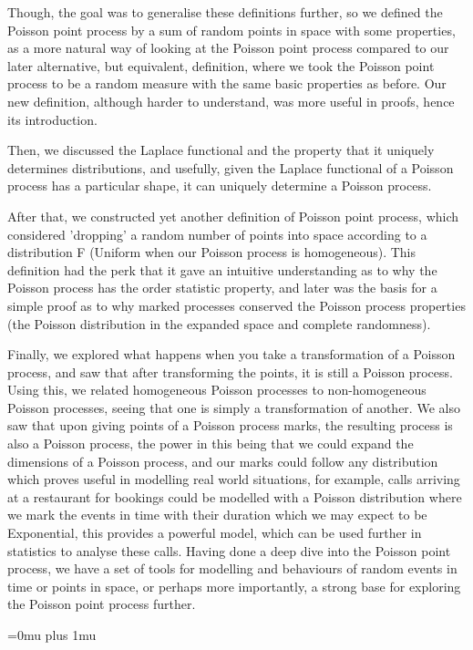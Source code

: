 \documentclass[11pt, oneside]{article}   	%
\theoremstyle{definition}
\theoremstyle{remark}
\begin{document}
Though, the goal was to generalise these definitions further, so we defined the Poisson point process by a sum of random points in space with some properties, as a more natural way of looking at the Poisson point process compared to our later alternative, but equivalent, definition, where we took the Poisson point process to be a random measure with the same basic properties as before. Our new definition, although harder to understand, was more useful in proofs, hence its introduction.

Then, we discussed the Laplace functional and the property that it uniquely determines distributions, and usefully, given the Laplace functional of a Poisson process has a particular shape, it can uniquely determine a Poisson process.

After that, we constructed yet another definition of Poisson point process, which considered 'dropping' a random number of points into space according to a distribution F (Uniform when our Poisson process is homogeneous). This definition had the perk that it gave an intuitive understanding as to why the Poisson process has the order statistic property, and later was the basis for a simple proof as to why marked processes conserved the Poisson process properties (the Poisson distribution in the expanded space and complete randomness).

Finally, we explored what happens when you take a transformation of a Poisson process, and saw that after transforming the points, it is still a Poisson process. Using this, we related homogeneous Poisson processes to non-homogeneous Poisson processes, seeing that one is simply a transformation of another. We also saw that upon giving points of a Poisson process marks, the resulting process is also a Poisson process, the power in this being that we could expand the dimensions of a Poisson process, and our marks could follow any distribution which proves useful in modelling real world situations, for example, calls arriving at a restaurant for bookings could be modelled with a Poisson distribution where we mark the events in time with their duration which we may expect to be Exponential, this provides a powerful model, which can be used further in statistics to analyse these calls.
Having done a deep dive into the Poisson point process, we have a set of tools for modelling and behaviours of random events in time or points in space, or perhaps more importantly, a strong base for exploring the Poisson point process further.








 




\newpage
{}


\Urlmuskip=0mu plus 1mu\relax
{}
\end{document}

